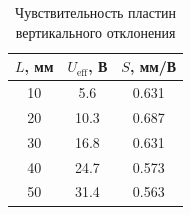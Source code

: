 \begin{table}[h]
\centering
\caption{Чувствительность пластин вертикального отклонения}
\label{tab:pvo}
\begin{tabular}{|c|c|c|}
\hline
$L$, мм & $U_{\text{eff}}$, В & $S$, мм/В \\
\hline
10 & 5.6 & 0.631 \\
20 & 10.3 & 0.687 \\
30 & 16.8 & 0.631 \\
40 & 24.7 & 0.573 \\
50 & 31.4 & 0.563 \\
\hline
\end{tabular}
\end{table}
